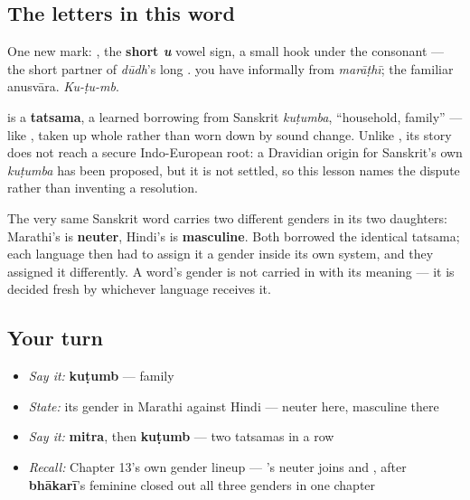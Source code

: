 \subsection*{The letters in this word}
One new mark: \textbf{}, the \textbf{short \emph{u}} vowel sign, a small hook under the consonant — the short partner of \emph{dūdh}'s long \textbf{}. \textbf{} you have informally from \emph{marāṭhī}; \textbf{} the familiar anusvāra. \emph{Ku-ṭu-mb}.

\begin{cousinweb}
\textbf{} is a \textbf{tatsama}, a learned borrowing from Sanskrit \textbf{} \emph{kuṭumba}, \textquotedblleft{}household, family\textquotedblright{} — like \textbf{}, taken up whole rather than worn down by sound change. Unlike \textbf{}, its story does not reach a secure Indo-European root: a Dravidian origin for Sanskrit's own \emph{kuṭumba} has been proposed, but it is not settled, so this lesson names the dispute rather than inventing a resolution.
\end{cousinweb}

\begin{grammarlens}[title={Grammar Lens: a gender Hindi disagrees with}]
The very same Sanskrit word carries two different genders in its two daughters: Marathi's \textbf{} is \textbf{neuter}, Hindi's \textbf{} is \textbf{masculine}. Both borrowed the identical tatsama; each language then had to assign it a gender inside its own system, and they assigned it differently. A word's gender is not carried in with its meaning — it is decided fresh by whichever language receives it.
\end{grammarlens}

\subsection*{Your turn}
\begin{itemize}
\raggedright
  \item \emph{Say it:} \textbf{kuṭumb} — family
  \item \emph{State:} its gender in Marathi against Hindi — neuter here, masculine there
  \item \emph{Say it:} \textbf{mitra}, then \textbf{kuṭumb} — two tatsamas in a row
  \item \emph{Recall:} Chapter 13's own gender lineup — \textbf{}'s neuter joins \textbf{} and \textbf{}, after \textbf{bhākarī}'s feminine closed out all three genders in one chapter
\end{itemize}

